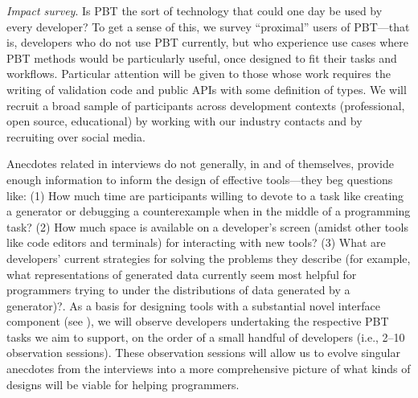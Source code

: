 \emph{Impact survey}. Is PBT the sort of
technology that could one day be used by every developer? To get a
sense of this, we survey ``proximal'' users of PBT---that is,
developers who do not use PBT currently, but who experience
use cases where PBT methods would be particularly useful,
once designed to fit their tasks and workflows. Particular
attention will be given to those whose work requires the
writing of validation code and public APIs with some
definition of types. We will recruit a broad sample of
participants across development contexts (professional, open
source, educational) by working with our industry contacts
and by recruiting over social media. 

\label{sec:observations}

Anecdotes related in interviews do not generally, in and of
themselves, provide enough information to inform the design of
effective tools---they beg questions like: (1) How much time
are participants willing to devote to
a task like creating a generator or debugging a counterexample when in the
middle of a programming task? (2) How much space is available on a developer's
screen (amidst other tools like code editors and terminals) for
interacting with new
tools? (3) What are developers' current strategies for solving the
problems they describe
(for example, what representations of generated data currently seem most helpful
for programmers trying to under the distributions of data generated by a
generator)?.  As a basis for designing tools with a substantial novel interface
component (see ), we will observe developers
undertaking the respective PBT tasks we
aim to support, on the order of a small handful of developers (i.e., 2--10
observation sessions). These observation sessions will allow us to evolve
singular anecdotes from the interviews into a more comprehensive picture of
what kinds of designs will be viable for helping programmers.

